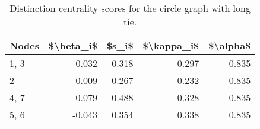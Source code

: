 \begin{table}
\centering
\caption{\label{tab:circlelong}Distinction centrality scores for the circle graph with long tie.}
\centering
\begin{tabular}[t]{lrrrr}
\toprule
Nodes & \$\textbackslash{}beta\_i\$ & \$s\_i\$ & \$\textbackslash{}kappa\_i\$ & \$\textbackslash{}alpha\$\\
\midrule
1, 3 & -0.032 & 0.318 & 0.297 & 0.835\\
2 & -0.009 & 0.267 & 0.232 & 0.835\\
4, 7 & 0.079 & 0.488 & 0.328 & 0.835\\
5, 6 & -0.043 & 0.354 & 0.338 & 0.835\\
\bottomrule
\end{tabular}
\end{table}
